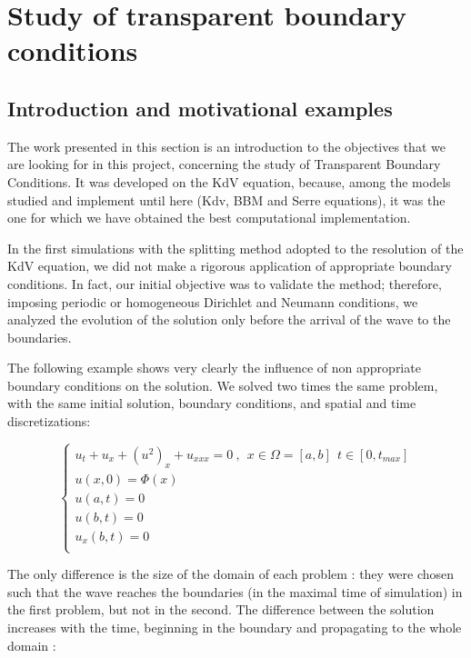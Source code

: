 \section{Study of transparent boundary conditions}
\label{sec:TBC}

\subsection{Introduction and motivational examples}

\indent The work presented in this section is an introduction to the objectives that we are looking for in this project, concerning the study of Transparent Boundary Conditions. It was developed on the KdV equation, because, among the models studied and implement until here (Kdv, BBM and Serre equations), it was the one for which we have obtained the best computational implementation.

\indent In the first simulations with the splitting method adopted to the resolution of the KdV equation, we did not make a rigorous application of appropriate boundary conditions. In fact, our initial objective was to validate the method; therefore, imposing periodic or homogeneous Dirichlet and Neumann conditions, we analyzed the evolution of the solution only before the arrival of the wave to the boundaries.

\indent The following example shows very clearly the influence of non appropriate boundary conditions on the solution. We solved two times the same problem, with the same initial solution, boundary conditions, and spatial and time discretizations: 

\begin{equation}
    \begin{cases}
    u_t + u_x + (u^2)_x + u_{xxx} = 0 \ , \ \ x \in \Omega=[a,b] \ \ t \in [0, t_{max}] \\
    u(x,0) = \Phi(x) \\
    u(a,t) = 0 \\
    u(b,t) = 0 \\
    u_x(b,t) = 0  \\ 
    \end{cases}
\end{equation}

\indent The only difference is the size of the domain of each problem : they were chosen such that the wave reaches the boundaries (in the maximal time of simulation) in the first problem, but not in the second. The difference between the solution increases with the time, beginning in the boundary and propagating to the whole domain :

